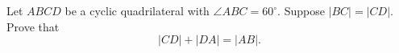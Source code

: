 Let $ABCD$ be a cyclic quadrilateral with $\angle ABC = 60^\circ$.
Suppose $|BC|=|CD|$. Prove that
$$|CD|+|DA| = |AB|.$$